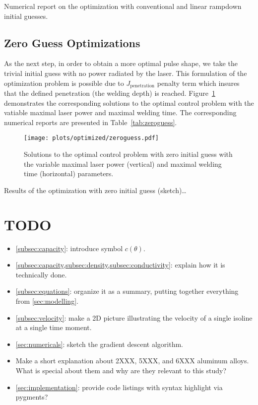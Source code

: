 \begin{table} \label{tab:rampdown}
	\centering
	
	\caption{Numerical report on the optimization with conventional and linear rampdown initial guesses.}
\end{table}


\subsection{Zero Guess Optimizations}

As the next step, in order to obtain a more optimal pulse shape, we take the trivial initial guess with no power radiated by the laser. This formulation of the optimization problem is possible due to $J_\text{penetration}$ penalty term which insures that the defined penetration (\ie the welding depth) is reached. Figure~\ref{fig:zeroguess} demonstrates the corresponding solutions to the optimal control problem with the vatiable maximal laser power and maximal welding time. The corresponding numerical reports are presented in Table~\ref{tab:zeroguess}.

\begin{figure} \label{fig:zeroguess}
	\centering
	\texttt{[image: plots/optimized/zeroguess.pdf]}
	\caption{Solutions to the optimal control problem with zero initial guess with the variable maximal laser power (vertical) and maximal welding time (horizontal) parameters.}
\end{figure}

\begin{table} \label{tab:zeroguess}
	\centering
	
	\caption{Results of the optimization with zero initial guess (sketch)\ldots}
\end{table}

\appendix


\section{TODO}
\begin{itemize}
	\item \cref{subsec:capacity}: introduce symbol $c(\theta)$.
	\item \cref{subsec:capacity,subsec:density,subsec:conductivity}: explain how it is technically done.
	\item \cref{subsec:equations}: organize it as a summary, putting together everything from \cref{sec:modelling}.
	\item \cref{subsec:velocity}: make a 2D picture illustrating the velocity of a single isoline at a single time moment.
	\item \cref{sec:numericals}: sketch the gradient descent algorithm.
	\item Make a short explanation about 2XXX, 5XXX, and 6XXX aluminum alloys. What is special about them and why are they relevant to this study?
	\item \cref{sec:implementation}: provide code listings with syntax highlight via pygments?
\end{itemize}
